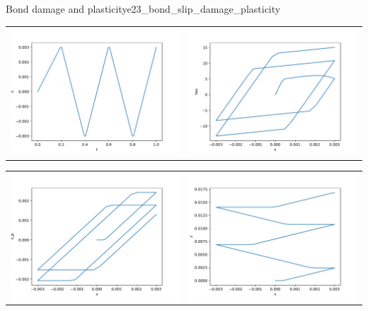\documentclass[main.tex]{subfiles}
\begin{document}
\begin{bmcsex}{Bond damage and plasticity}{e23_bond_slip_damage_plasticity}
\begin{center}
\noindent
\begin{longtable}{L{7.5cm}L{7.5cm}}
\includegraphics[width=7.5cm]{examples/e23_bond_slip_damage_plasticity/fig_s-t.pdf}
 & 
\includegraphics[width=7.5cm]{examples/e23_bond_slip_damage_plasticity/fig_tau-s.pdf}
 \\\end{longtable}

\noindent
\begin{longtable}{L{7.5cm}L{7.5cm}}
\includegraphics[width=7.5cm]{examples/e23_bond_slip_damage_plasticity/fig_s_p-s.pdf}
 & 
\includegraphics[width=7.5cm]{examples/e23_bond_slip_damage_plasticity/fig_z-s.pdf}
 \\\end{longtable}


\end{center}
\end{bmcsex}
\end{document}
